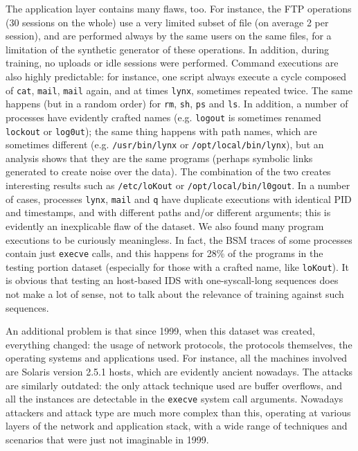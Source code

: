 The application layer contains many flaws, too. For instance, the
\ac{FTP} operations (30 sessions on the whole) use a very
limited subset of file (on average 2 per session), and are performed
always by the same users on the same files, for a limitation of the
synthetic generator of these operations. In addition, during training,
no uploads or idle sessions were performed. Command executions are
also highly predictable: for instance, one script always execute a
cycle composed of \texttt{cat}, \texttt{mail}, \texttt{mail} again,
and at times \texttt{lynx}, sometimes repeated twice. The same happens
(but in a random order) for \texttt{rm}, \texttt{sh}, \texttt{ps} and
\texttt{ls}. In addition, a number of processes have evidently crafted
names (e.g. \texttt{logout} is sometimes renamed \texttt{lockout} or
\texttt{log0ut}); the same thing happens with path names, which are
sometimes different (e.g. \texttt{/usr/bin/lynx} or
\texttt{/opt/local/bin/lynx}), but an analysis shows that they are the
same programs (perhaps symbolic links generated to create noise over
the data). The combination of the two creates interesting results such
as \texttt{/etc/loKout} or \texttt{/opt/local/bin/l0gout}. In a number
of cases, processes \texttt{lynx}, \texttt{mail} and \texttt{q} have
duplicate executions with identical \ac{PID} and
timestamps, and with different paths and/or different arguments; this
is evidently an inexplicable flaw of the dataset. We also found many
program executions to be curiously meaningless. In fact, the
\ac{BSM} traces of some processes contain just
\texttt{execve} calls, and this happens for 28\% of the programs in
the testing portion dataset (especially for those with a crafted name,
like \texttt{loKout}). It is obvious that testing an host-based
\ac{IDS} with one-syscall-long sequences does not make a
lot of sense, not to talk about the relevance of training against such
sequences.

An additional problem is that since 1999, when this dataset was
created, everything changed: the usage of network protocols, the
protocols themselves, the operating systems and applications used. For
instance, all the machines involved are \textsf{Solaris} version 2.5.1 hosts,
which are evidently ancient nowadays. The attacks are similarly
outdated: the only attack technique used are buffer overflows, and all
the instances are detectable in the \texttt{execve} system call
arguments. Nowadays attackers and attack type are much more complex
than this, operating at various layers of the network and application
stack, with a wide range of techniques and scenarios that were just
not imaginable in 1999.

